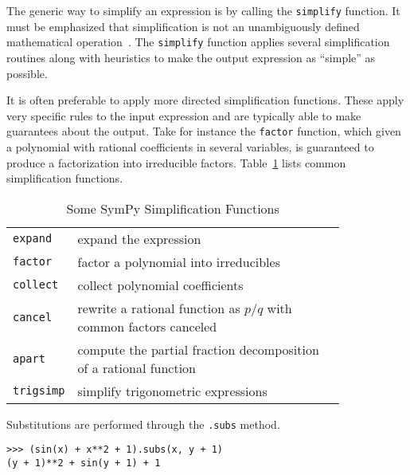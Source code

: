 



The generic way to simplify an expression is by calling the \texttt{simplify}
function.
It must be emphasized that simplification is not an unambiguously defined
mathematical operation~\cite{Carette2004understanding}.
The \texttt{simplify} function applies several simplification routines along
with heuristics to make the output expression as ``simple'' as possible.

It is often preferable to apply more directed simplification functions. These
apply very specific rules to the input expression and are typically able to make
guarantees about the output. Take for instance the \texttt{factor} function,
which given a polynomial with rational coefficients in several variables,
is guaranteed to
produce a factorization into irreducible factors. Table~\ref{simplify-table}
lists common simplification functions.

\begin{longtable}[htbc]{lp{0.83\linewidth}}
\caption{Some SymPy Simplification Functions\label{simplify-table}}\\
\toprule
\verb|expand| & expand the expression \\
\verb|factor| & factor a polynomial into irreducibles \\
\verb|collect| & collect polynomial coefficients \\
\verb|cancel| & rewrite a rational function as $p/q$ with common factors
canceled \\
\verb|apart| & compute the partial fraction decomposition of a rational function
\\
\verb|trigsimp| & simplify trigonometric expressions~\cite{fu2006automated} \\
\bottomrule
\end{longtable}

Substitutions are performed through the \texttt{.subs} method.
\begin{verbatim}
>>> (sin(x) + x**2 + 1).subs(x, y + 1)
(y + 1)**2 + sin(y + 1) + 1
\end{verbatim}
